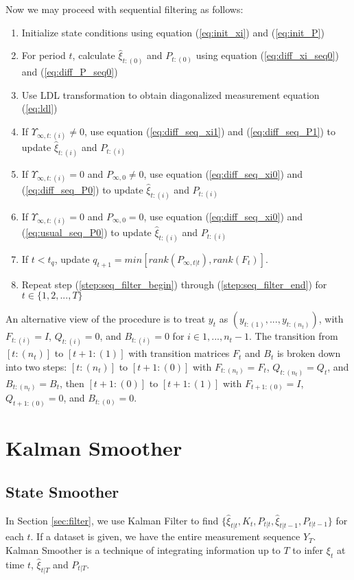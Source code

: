 \documentclass[10pt]{article}
\newenvironment{boenumerate}
    {\begin{enumerate}\renewcommand\labelenumi{\textbf\theenumi}}
    {\end{enumerate}}
\numberwithin{equation}{section}
\begin{document}
Now we may proceed with sequential filtering as follows:
\begin{boenumerate}
    \item Initialize state conditions using equation (\ref{eq:init_xi}) and (\ref{eq:init_P}) 
    \item For period $t$, calculate $\hat{\xi}_{t:(0)}$ and $P_{t:{(0)}}$ using equation (\ref{eq:diff_xi_seq0}) and (\ref{eq:diff_P_seq0}) \label{step:seq_filter_begin}
    \item Use LDL transformation to obtain diagonalized measurement equation (\ref{eq:ldl})
    \item If $\Upsilon_{\infty,t:(i)}\neq0$, use equation (\ref{eq:diff_seq_xi1}) and (\ref{eq:diff_seq_P1}) to update $\hat{\xi}_{t:(i)}$ and $P_{t:(i)}$
    \item If $\Upsilon_{\infty,t:(i)}=0$ and $P_{\infty,0}\neq0$, use equation (\ref{eq:diff_seq_xi0}) and (\ref{eq:diff_seq_P0}) to update $\hat{\xi}_{t:(i)}$ and $P_{t:(i)}$ 
    \item If $\Upsilon_{\infty,t:(i)}=0$ and $P_{\infty,0}=0$, use equation (\ref{eq:diff_seq_xi0}) and (\ref{eq:usual_seq_P0}) to update $\hat{\xi}_{t:(i)}$ and $P_{t:(i)}$ 
    \item If $t<t_q$, update $q_{t+1} = min[rank(P_{\infty,t|t}), rank(F_t)]$. \label{step:seq_filter_end}
    \item Repeat step (\ref{step:seq_filter_begin}) through (\ref{step:seq_filter_end}) for $t\in\{1,2,...,T\}$
\end{boenumerate}

An alternative view of the procedure is to treat $y_t$ as $(y_{t:(1)},...,y_{t:(n_t)})$, with $F_{t:(i)}=I$, $Q_{t:(i)}=0$, and $B_{t:(i)}=0$ for $i\in{1,...,n_t-1}$. The transition from $[t:(n_t)]$ to $[t+1:(1)]$ with transition matrices $F_t$ and $B_t$ is broken down into two steps: $[t:(n_t)]$ to $[t+1:(0)]$ with $F_{t:(n_t)}=F_t$, $Q_{t:(n_t)}=Q_t$, and $B_{t:(n_t)}=B_t$, then $[t+1:(0)]$ to $[t+1:(1)]$ with $F_{t+1:(0)}=I$, $Q_{t+1:(0)}=0$, and $B_{t:(0)}=0$.

\section{Kalman Smoother} \label{sec:smoother}
\subsection{State Smoother}
In Section \ref{sec:filter}, we use Kalman Filter to find $\{\hat{\xi}_{t|t}, K_t, P_{t|t}, \hat{\xi}_{t|t-1}, P_{t|t-1}\}$ for each $t$. If a dataset is given, we have the entire measurement sequence $Y_T$. Kalman Smoother is a technique of integrating information up to $T$ to infer $\xi_t$ at time $t$, $\hat{\xi}_{t|T}$ and $P_{t|T}$. 
\end{document}

